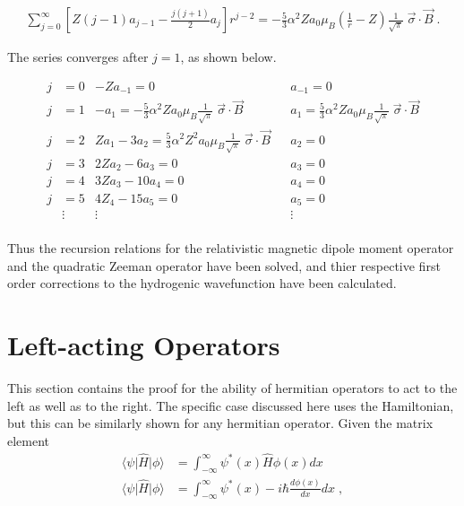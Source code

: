     \begin{align}
        \sum_{j = 0}^\infty \left[ Z(j-1)a_{j-1} - \frac{j(j+1)}{2} a_j \right] r^{j-2} = -\frac{5}{3} \alpha^2 Z a_0 \mu_B \left(\frac{1}{r} - Z \right) \frac{1}{\sqrt{\pi}}\; \vec{\sigma} \cdot \vec{B}\;.
    \end{align}

    \noindent The series converges after $j = 1$, as shown below.

    \begin{align*}
        j &= 0 & -Za_{-1} = 0& &a_{-1} = 0\\ \nonumber
        j &= 1 & -a_1 = -\frac{5}{3} \alpha^2 Z a_0 \mu_B  \frac{1}{\sqrt{\pi}}\; \vec{\sigma} \cdot \vec{B} & &a_{1} = \frac{5}{3} \alpha^2 Z a_0 \mu_B \frac{1}{\sqrt{\pi}}\; \vec{\sigma} \cdot \vec{B}\\ \nonumber
        j &= 2 & Za_1 - 3a_2 = \frac{5}{3} \alpha^2 Z^2 a_0 \mu_B \frac{1}{\sqrt{\pi}}\; \vec{\sigma} \cdot \vec{B} && a_2 = 0\\ \nonumber
        j &= 3 & 2Za_2 - 6a_3 = 0&& a_3 = 0\\ \nonumber
        j &= 4 & 3Za_3 - 10a_4 =0 && a_4 = 0\\ \nonumber
        j &= 5 & 4Z_4 - 15a_5 = 0 && a_5 = 0 \\ \nonumber
        & \vdots & \vdots && \vdots \\
    \end{align*}

    \noindent Thus the recursion relations for the relativistic magnetic dipole moment operator and the quadratic Zeeman operator have been solved, and thier respective first order corrections to the hydrogenic wavefunction have been calculated.

\chapter{Left-acting Operators} \label{sec:Hermitian_Left}
    This section contains the proof for the ability of hermitian operators to act to the left as well as to the right. The specific case discussed here uses the Hamiltonian, but this can be similarly shown for any hermitian operator. Given the matrix element
    \begin{align}
        \langle \psi \vert \hat{H} \vert \phi \rangle &= \int^\infty_{-\infty} \psi^*(x) \hat{H} \phi(x) dx\\
        \langle \psi \vert \hat{H} \vert \phi \rangle &= \int^\infty_{-\infty} \psi^*(x) -i\hbar\frac{d \phi(x)}{dx} dx\;,
    \end{align}

